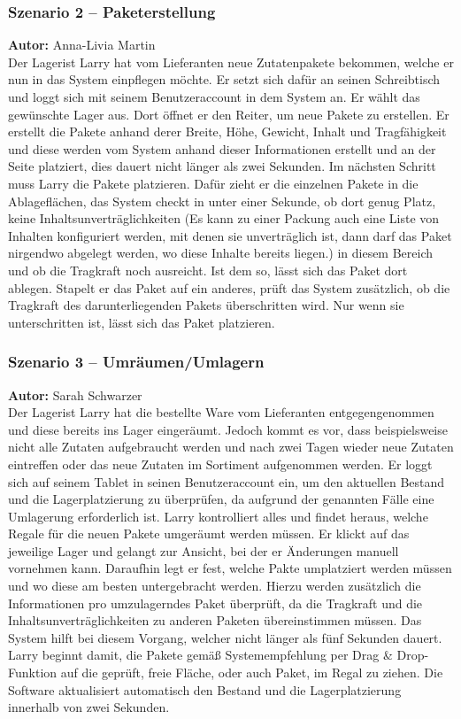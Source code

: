 \subsubsection{Szenario 2 – Paketerstellung}
\textbf{Autor:} Anna-Livia Martin\\
Der Lagerist Larry hat vom Lieferanten neue Zutatenpakete bekommen, welche er nun in das System einpflegen möchte.
Er setzt sich dafür an seinen Schreibtisch und loggt sich mit seinem Benutzeraccount in dem System an. Er wählt das
gewünschte Lager aus. Dort öffnet er den Reiter, um neue Pakete zu erstellen. Er erstellt die Pakete anhand derer
Breite, Höhe, Gewicht, Inhalt und Tragfähigkeit und diese werden vom
System anhand dieser Informationen erstellt und an der Seite platziert, dies dauert nicht länger als zwei Sekunden. Im nächsten Schritt muss Larry die
Pakete platzieren. Dafür zieht er die einzelnen Pakete in die Ablageflächen, das System checkt in unter einer Sekunde,
ob dort genug Platz, keine Inhaltsunverträglichkeiten (Es kann zu einer Packung auch eine Liste von Inhalten konfiguriert werden, mit denen sie
unverträglich ist, dann darf das Paket nirgendwo abgelegt werden, wo diese Inhalte bereits liegen.) in diesem Bereich und ob die Tragkraft noch ausreicht. Ist dem
so, lässt sich das Paket dort ablegen. Stapelt er das Paket auf ein anderes, prüft das System zusätzlich,  ob die
Tragkraft des darunterliegenden Pakets überschritten wird. Nur wenn sie unterschritten ist, lässt sich das Paket platzieren.

\subsubsection{Szenario 3 – Umräumen/Umlagern}
\textbf{Autor:} Sarah Schwarzer\\
Der Lagerist Larry hat die bestellte Ware vom Lieferanten entgegengenommen und diese bereits ins Lager eingeräumt.
Jedoch kommt es vor, dass beispielsweise nicht alle Zutaten aufgebraucht werden und nach zwei Tagen wieder neue Zutaten
eintreffen oder das neue Zutaten im Sortiment aufgenommen werden. Er loggt sich auf seinem Tablet in seinen Benutzeraccount ein,
um den aktuellen Bestand und die Lagerplatzierung zu überprüfen, da aufgrund der genannten Fälle eine Umlagerung erforderlich ist.
Larry kontrolliert alles und findet heraus, welche Regale für die neuen Pakete umgeräumt werden müssen. Er klickt auf das jeweilige
Lager und gelangt zur Ansicht, bei der er Änderungen manuell vornehmen kann. Daraufhin legt er fest, welche Pakte umplatziert werden
müssen und wo diese am besten untergebracht werden. Hierzu werden zusätzlich die Informationen pro umzulagerndes Paket überprüft,
da die Tragkraft und die Inhaltsunverträglichkeiten zu anderen Paketen übereinstimmen müssen. Das System hilft bei diesem Vorgang,
welcher nicht länger als fünf Sekunden dauert. Larry beginnt damit, die Pakete gemäß Systemempfehlung per Drag \& Drop-Funktion auf die geprüft,
freie Fläche, oder auch Paket, im Regal zu ziehen. Die Software aktualisiert automatisch den Bestand und die Lagerplatzierung innerhalb von zwei Sekunden.


